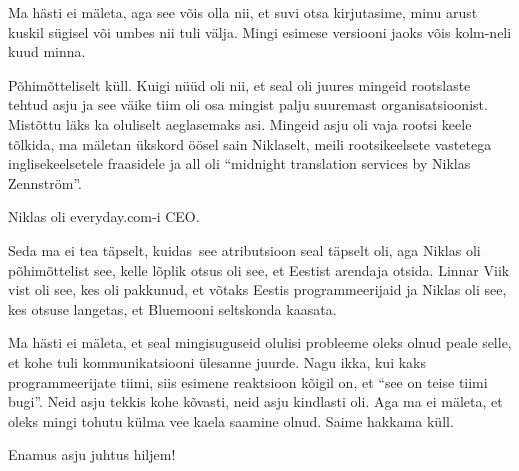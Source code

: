 
Ma hästi ei mäleta, aga see võis olla nii, et  suvi otsa kirjutasime,  minu arust kuskil sügisel või umbes nii tuli välja. Mingi esimese versiooni jaoks võis kolm-neli kuud minna.


Põhimõtteliselt küll. Kuigi nüüd oli nii, et seal oli juures mingeid rootslaste tehtud asju ja see väike tiim oli osa mingist palju suuremast organisatsioonist. Mistõttu läks ka oluliselt aeglasemaks asi. Mingeid asju oli vaja rootsi keele tõlkida, ma mäletan ükskord öösel sain Niklaselt, meili rootsikeelsete vastetega inglisekeelsetele fraasidele ja all oli \enquote{midnight translation services by Niklas Zennström}.


Niklas oli everyday.com-i CEO. 


Seda ma ei tea täpselt, kuidas see atributsioon seal täpselt  oli, aga Niklas oli põhimõttelist see, kelle lõplik otsus oli see, et Eestist arendaja otsida. Linnar Viik vist oli see, kes oli pakkunud, et võtaks Eestis programmeerijaid ja Niklas oli see, kes otsuse langetas, et Bluemooni seltskonda kaasata.


Ma hästi ei mäleta, et seal mingisuguseid olulisi probleeme oleks olnud peale selle, et kohe tuli  kommunikatsiooni ülesanne juurde. Nagu ikka, kui kaks programmeerijate tiimi, siis esimene reaktsioon kõigil on, et \enquote{see on teise tiimi bugi}. Neid asju  tekkis kohe kõvasti, neid asju kindlasti oli. Aga ma ei mäleta, et oleks mingi tohutu külma vee kaela saamine olnud. Saime hakkama küll. 


Enamus asju juhtus hiljem!

